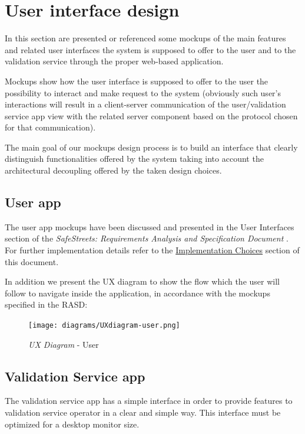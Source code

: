 \setlength{\parindent}{4ex}
\setlength{\parskip}{1ex}

\section{User interface design}
In this section are presented or referenced some mockups of the main features and related user interfaces the system is supposed to offer to the user and to the validation service through the proper web-based application.

Mockups show how the user interface is supposed to offer to the user the possibility to interact and make request to the system (obviously such user's interactions will result in a client-server communication of the user/validation service app view with the related server component based on the protocol chosen for that communication).

The main goal of our mockups design process is to build an interface that clearly distinguish functionalities offered by the system taking into account the architectural decoupling offered by the taken design choices.

\subsection{User app}
The user app mockups have been discussed and presented in the User Interfaces section of the \emph{SafeStreets: Requirements Analysis and Specification Document} \cite{RASD}. For further implementation details refer to the \hyperref[sec:implementationChoices]{Implementation Choices} section of this document.

In addition we present the UX diagram to show the flow which the user will follow to navigate inside the application, in accordance with the mockups specified in the RASD:

\begin{figure}[ht!]
	\centering
	\texttt{[image: diagrams/UXdiagram-user.png]}
	\caption{
		\label{fig:uxuser} 
		\emph{UX Diagram} - User
	}
\end{figure}

\subsection{Validation Service app}
The validation service app has a simple interface in order to provide features to validation service operator in a clear and simple way. This interface must be optimized for a desktop monitor size.

